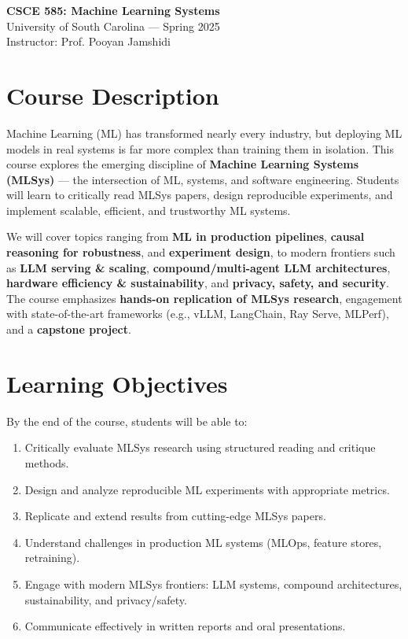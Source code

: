 \documentclass[11pt]{article}
\begin{document}
\begin{center}
{\Large \textbf{CSCE 585: Machine Learning Systems}} \\
University of South Carolina — Spring 2025 \\
Instructor: Prof. Pooyan Jamshidi
\end{center}

\section*{Course Description}
Machine Learning (ML) has transformed nearly every industry, but deploying ML models in real systems is far more complex than training them in isolation. This course explores the emerging discipline of \textbf{Machine Learning Systems (MLSys)} — the intersection of ML, systems, and software engineering. Students will learn to critically read MLSys papers, design reproducible experiments, and implement scalable, efficient, and trustworthy ML systems.

We will cover topics ranging from \textbf{ML in production pipelines}, \textbf{causal reasoning for robustness}, and \textbf{experiment design}, to modern frontiers such as \textbf{LLM serving \& scaling}, \textbf{compound/multi-agent LLM architectures}, \textbf{hardware efficiency \& sustainability}, and \textbf{privacy, safety, and security}. The course emphasizes \textbf{hands-on replication of MLSys research}, engagement with state-of-the-art frameworks (e.g., vLLM, LangChain, Ray Serve, MLPerf), and a \textbf{capstone project}.

\section*{Learning Objectives}
By the end of the course, students will be able to:
\begin{enumerate}[leftmargin=*]
    \item Critically evaluate MLSys research using structured reading and critique methods.
    \item Design and analyze reproducible ML experiments with appropriate metrics.
    \item Replicate and extend results from cutting-edge MLSys papers.
    \item Understand challenges in production ML systems (MLOps, feature stores, retraining).
    \item Engage with modern MLSys frontiers: LLM systems, compound architectures, sustainability, and privacy/safety.
    \item Communicate effectively in written reports and oral presentations.
\end{enumerate}
\end{document}
